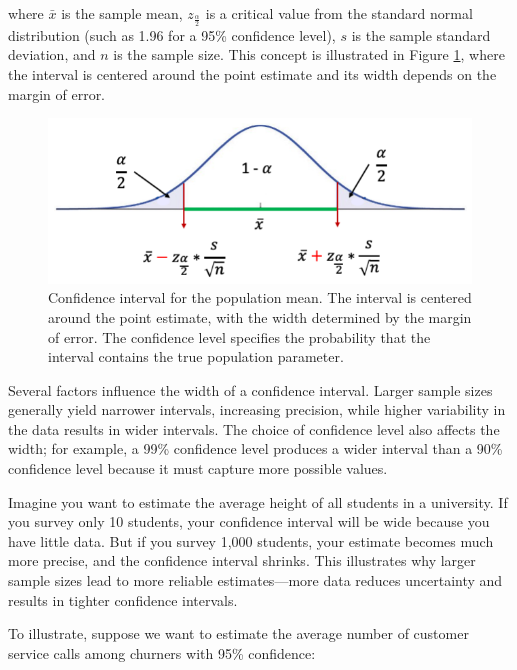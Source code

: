 \documentclass[
]{book}
\theoremstyle{definition}
\theoremstyle{definition}
\theoremstyle{definition}
\theoremstyle{definition}
\theoremstyle{remark}
\begin{document}
where \(\bar{x}\) is the sample mean, \(z_{\frac{\alpha}{2}}\) is a critical value from the standard normal distribution (such as 1.96 for a 95\% confidence level), \(s\) is the sample standard deviation, and \(n\) is the sample size. This concept is illustrated in Figure \ref{fig:confidence-interval}, where the interval is centered around the point estimate and its width depends on the margin of error.

\begin{figure}

{\centering \includegraphics[width=0.8\linewidth]{images/confidence_interval} 

}

\caption{Confidence interval for the population mean. The interval is centered around the point estimate, with the width determined by the margin of error. The confidence level specifies the probability that the interval contains the true population parameter.}\label{fig:confidence-interval}
\end{figure}

Several factors influence the width of a confidence interval. Larger sample sizes generally yield narrower intervals, increasing precision, while higher variability in the data results in wider intervals. The choice of confidence level also affects the width; for example, a 99\% confidence level produces a wider interval than a 90\% confidence level because it must capture more possible values.

Imagine you want to estimate the average height of all students in a university. If you survey only 10 students, your confidence interval will be wide because you have little data. But if you survey 1,000 students, your estimate becomes much more precise, and the confidence interval shrinks. This illustrates why larger sample sizes lead to more reliable estimates---more data reduces uncertainty and results in tighter confidence intervals.

To illustrate, suppose we want to estimate the average number of customer service calls among churners with 95\% confidence:
\end{document}
